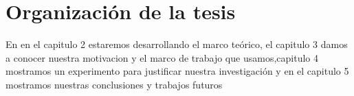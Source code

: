\section{Organización de la tesis}

En en el capitulo 2 estaremos desarrollando el marco teórico, el capitulo 3 damos a conocer nuestra motivacion y el marco de trabajo que usamos,capitulo 4 mostramos un experimento para justificar nuestra investigación y en el capitulo 5 mostramos nuestras conclusiones y trabajos futuros
